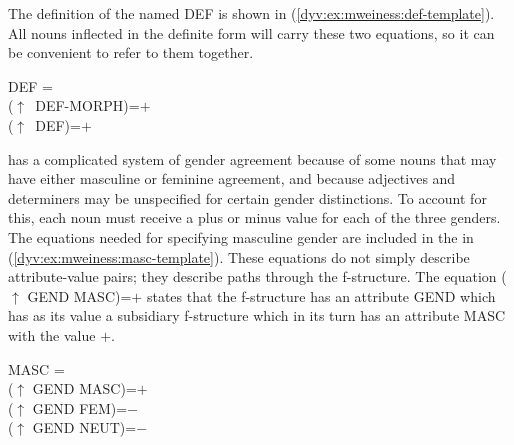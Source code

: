 \documentclass[output=paper]{langsci/langscibook}
\begin{document}
The definition of the  named DEF is shown in (\ref{dyv:ex:mweiness:def-template}).
All nouns inflected in the definite form will carry these two equations, so it can be convenient to refer to them together.

\ea\label{dyv:ex:mweiness:def-template}
{\small 
DEF = \\
\hspace{2em}  ($\uparrow$~DEF-MORPH)=$+$ \\
\hspace{2em}  ($\uparrow$~DEF)=$+$ \\
}
\z



 has a complicated system of gender agreement because of some nouns that may have either masculine or feminine agreement, and because adjectives and determiners may be unspecified for certain gender distinctions.
To account for this, each noun must receive a plus or minus value for each of the three genders.
The equations needed for specifying masculine gender are included in the  in (\ref{dyv:ex:mweiness:masc-template}).
These equations do not simply describe attribute-value pairs; they describe paths through the f-structure.
The equation ($\uparrow$ GEND MASC)=$+$ states that the f-structure has an attribute GEND which has as its value a subsidiary f-structure which in its turn has an attribute MASC with the value $+$.

\ea\label{dyv:ex:mweiness:masc-template}
{\small 
MASC = \\
\hspace{2em}  ($\uparrow$ GEND MASC)=$+$ \\
\hspace{2em}  ($\uparrow$ GEND FEM)=$-$ \\
\hspace{2em}  ($\uparrow$ GEND NEUT)=$-$ \\
}
\z
\end{document}
